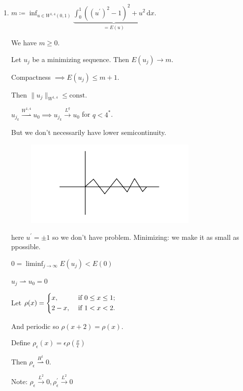 \documentclass{article}
\theoremstyle{definition}
\begin{document}
\begin{enumerate}[label=\arabic*)]
    \item \(m\coloneqq \inf_{u\in W^{1,4}(0,1)} \underbrace{\int_{0}^{1} ((u^{\prime})^2 - 1)^2 + u^2 \,\mathrm{d}x}_{=E(u)}\).
    
    We have \(m \geq 0\).

    Let \(u_j\) be a minimizing sequence. Then \(E(u_j) \to m\).

    Compactness \(\implies E(u_j) \leq m+1\).

    Then \(\lVert u_j \rVert _{W^{1,4}} \leq \text{const}\).

    \(u_{j_k} \overset{W^{1,4}}{\rightharpoonup} u_0 \implies u_{j_k} \overset{L^q}{\to} u_0\) for \(q < 4^{\ast}\).
    
    But we don't necessarily have lower semicontinuity.

    \begin{figure}[H]
        \centering
        \includegraphics[width=0.8\textwidth]{img/sawtooth}
        \caption{}
        \label{fig:sawtooth}
    \end{figure}

    here \(u^{\prime} = \pm 1\) so we don't have problem. Minimizing: we make it as small as ppossible.

    \(0 = \liminf_{j \to \infty} E(u_j) < E(0)\)

    \(u_j \rightharpoonup u_0 = 0\) 

    Let \(\rho(x) = \begin{dcases}
        x, &\text{ if } 0 \leq x \leq 1 ;\\
        2-x, &\text{ if } 1 <x < 2.
    \end{dcases}\) 

    And periodic so \(\rho(x+2) = \rho(x)\).

    Define \(\rho_{\epsilon} (x) = \epsilon \rho(\frac{x}{\epsilon})\) 

    Then \(\rho_{\epsilon} \overset{H^1}{\rightharpoonup} 0\).

    Note: \(\rho_{\epsilon} \overset{L^2}{\to} 0, \rho_{\epsilon} ^{\prime} \overset{L^2}{\to} 0\) 

\end{enumerate} 
\end{document}
